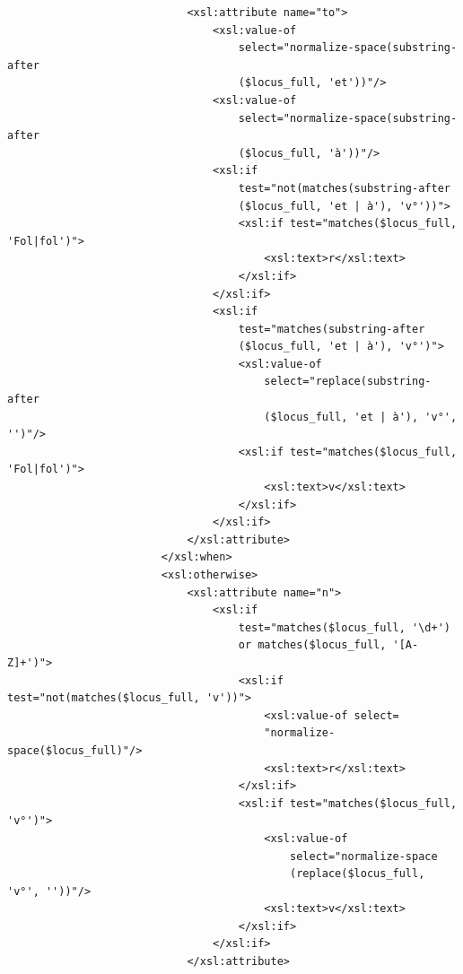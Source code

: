 \documentclass[a4paper,12pt,twoside]{book}
\begin{document}
\begin{verbatim}
                            <xsl:attribute name="to">
                                <xsl:value-of
                                    select="normalize-space(substring-after
                                    ($locus_full, 'et'))"/>
                                <xsl:value-of
                                    select="normalize-space(substring-after
                                    ($locus_full, 'à'))"/>
                                <xsl:if
                                    test="not(matches(substring-after
                                    ($locus_full, 'et | à'), 'v°'))">
                                    <xsl:if test="matches($locus_full, 'Fol|fol')">
                                        <xsl:text>r</xsl:text>
                                    </xsl:if>
                                </xsl:if>
                                <xsl:if
                                    test="matches(substring-after
                                    ($locus_full, 'et | à'), 'v°')">
                                    <xsl:value-of
                                        select="replace(substring-after
                                        ($locus_full, 'et | à'), 'v°', '')"/>
                                    <xsl:if test="matches($locus_full, 'Fol|fol')">
                                        <xsl:text>v</xsl:text>
                                    </xsl:if>
                                </xsl:if>
                            </xsl:attribute>
                        </xsl:when>
                        <xsl:otherwise>
                            <xsl:attribute name="n">
                                <xsl:if
                                    test="matches($locus_full, '\d+') 
                                    or matches($locus_full, '[A-Z]+')">
                                    <xsl:if test="not(matches($locus_full, 'v'))">
                                        <xsl:value-of select=
                                        "normalize-space($locus_full)"/>
                                        <xsl:text>r</xsl:text>
                                    </xsl:if>
                                    <xsl:if test="matches($locus_full, 'v°')">
                                        <xsl:value-of
                                            select="normalize-space
                                            (replace($locus_full, 'v°', ''))"/>
                                        <xsl:text>v</xsl:text>
                                    </xsl:if>
                                </xsl:if>
                            </xsl:attribute>

\end{verbatim}
\end{document}
